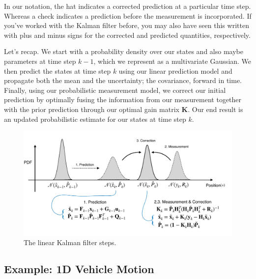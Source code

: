 In our notation, the hat indicates a corrected prediction
at a particular time step. Whereas a check indicates a prediction before
the measurement is incorporated. If you've worked with the
Kalman filter before, you may also have seen this
written with plus and minus signs for the corrected and
predicted quantities, respectively. 

Let's recap. We start with
a probability density over our states and also maybe parameters
at time step $k-1$, which we represent as
a multivariate Gaussian. We then predict the states
at time step $k$ using our linear prediction model and propagate both the mean
and the uncertainty; the covariance, forward in time. Finally, using our probabilistic
measurement model, we correct our initial
prediction by optimally fusing the information from
our measurement together with the prior prediction through our optimal
gain matrix $\mathbf{K}$. Our end result is an updated probabilistic estimate
for our states at time step $k$. 

\begin{figure}[!htb]
\begin{center}
\includegraphics[scale=0.280]{img/kalman_filter/kalman_3.jpeg}
\end{center}
\caption{The linear Kalman filter steps.}
\label{kalman_3}
\end{figure}

\subsection{Example: 1D Vehicle Motion}

